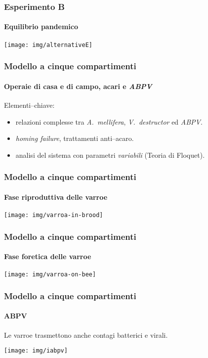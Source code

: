 \documentclass[]{beamer} %
\begin{document}
\begin{frame}
    \frametitle{Esperimento B}
    \framesubtitle{Equilibrio pandemico}

    \begin{center}
        \texttt{[image: img/alternativeE]}
    \end{center}
\end{frame}


\begin{frame}
    \frametitle{Modello a cinque compartimenti}
    \framesubtitle{Operaie di casa e di campo, acari e \emph{ABPV}}

    \cite{ratti2017}

    \vspace{1em}
    Elementi--chiave:
    \begin{itemize}
        \item \pause relazioni complesse tra \emph{A.~mellifera}, \emph{V.~destructor} ed \emph{ABPV}.
        \item \pause \emph{homing failure}, trattamenti anti--acaro.
        \item \pause analisi del sistema con parametri \emph{variabili} (Teoria di Floquet).
    \end{itemize}
\end{frame}

\begin{frame}
    \frametitle{Modello a cinque compartimenti}
    \framesubtitle{Fase riproduttiva delle varroe}

    \begin{center}
        \texttt{[image: img/varroa-in-brood]}
    \end{center}
\end{frame}

\begin{frame}
    \frametitle{Modello a cinque compartimenti}
    \framesubtitle{Fase foretica delle varroe}

    \begin{center}
        \texttt{[image: img/varroa-on-bee]}
    \end{center}
\end{frame}

\begin{frame}
    \frametitle{Modello a cinque compartimenti}
    \framesubtitle{ABPV}

    Le varroe trasmettono anche contagi batterici e virali.

    \begin{center}
        \texttt{[image: img/iabpv]}
    \end{center}
\end{frame}
\end{document}
